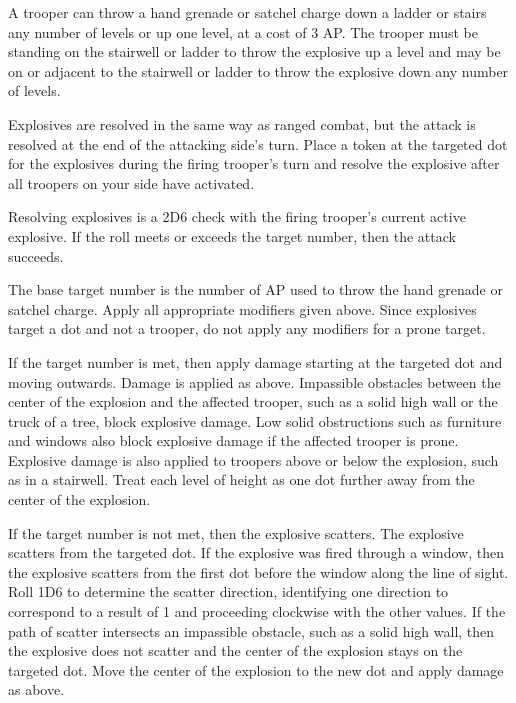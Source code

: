 A trooper can throw a hand grenade or satchel charge down a ladder or stairs any number of levels or up one level, at a cost of 3 AP.
The trooper must be standing on the stairwell or ladder to throw the explosive up a level and may be on or adjacent to the stairwell or ladder to throw the explosive down any number of levels.

Explosives are resolved in the same way as ranged combat, but the attack is resolved at the end of the attacking side's turn.
Place a token at the targeted dot for the explosives during the firing trooper's turn and resolve the explosive after all troopers on your side have activated.

Resolving explosives is a 2D6 check with the firing trooper's current active explosive.
If the roll meets or exceeds the target number, then the attack succeeds.

The base target number is the number of AP used to throw the hand grenade or satchel charge.
Apply all appropriate modifiers given above.
Since explosives target a dot and not a trooper, do not apply any modifiers for a prone target.

If the target number is met, then apply damage starting at the targeted dot and moving outwards.
Damage is applied as above.
Impassible obstacles between the center of the explosion and the affected trooper, such as a solid high wall or the truck of a tree, block explosive damage.
Low solid obstructions such as furniture and windows also block explosive damage if the affected trooper is prone.
Explosive damage is also applied to troopers above or below the explosion, such as in a stairwell.
Treat each level of height as one dot further away from the center of the explosion.

If the target number is not met, then the explosive scatters.
The explosive scatters from the targeted dot.
If the explosive was fired through a window, then the explosive scatters from the first dot before the window along the line of sight.
Roll 1D6 to determine the scatter direction, identifying one direction to correspond to a result of 1 and proceeding clockwise with the other values.
If the path of scatter intersects an impassible obstacle, such as a solid high wall, then the explosive does not scatter and the center of the explosion stays on the targeted dot.
Move the center of the explosion to the new dot and apply damage as above.
